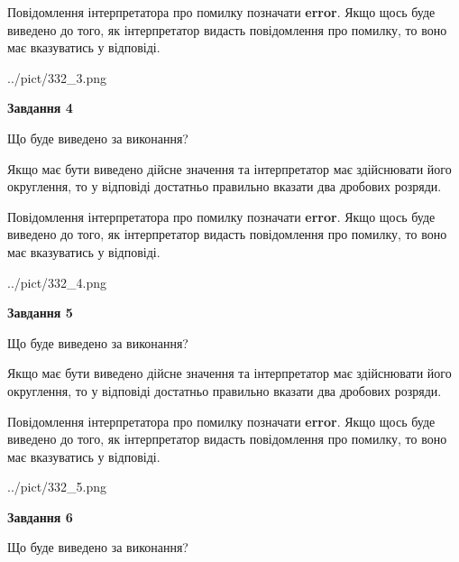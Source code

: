 \documentclass[12pt, ukrainian]{article}
\begin{document}
{\begin {Large}
Повідомлення інтерпретатора про помилку позначати \textbf{error}.
Якщо щось буде виведено до того, як інтерпретатор видасть повідомлення про помилку, 
то воно має вказуватись у відповіді. \par

\begin{center}
	{../pict/332_3.png}
\end{center}
\newpage

{\begin {center}\textbf{Завдання 4}\end {center}}\par
Що буде виведено за виконання? \par

Якщо має бути виведено дійсне значення та інтерпретатор має здійснювати його округлення, 
то у відповіді достатньо правильно вказати два дробових розряди.

Повідомлення інтерпретатора про помилку позначати \textbf{error}.
Якщо щось буде виведено до того, як інтерпретатор видасть повідомлення про помилку, 
то воно має вказуватись у відповіді. \par

\begin{center}
	{../pict/332_4.png}
\end{center}
\newpage

{\begin {center}\textbf{Завдання 5}\end {center}}\par
Що буде виведено за виконання? \par

Якщо має бути виведено дійсне значення та інтерпретатор має здійснювати його округлення, 
то у відповіді достатньо правильно вказати два дробових розряди.

Повідомлення інтерпретатора про помилку позначати \textbf{error}.
Якщо щось буде виведено до того, як інтерпретатор видасть повідомлення про помилку, 
то воно має вказуватись у відповіді. \par

\begin{center}
	{../pict/332_5.png}
\end{center}
\newpage

{\begin {center}\textbf{Завдання 6}\end {center}}\par
Що буде виведено за виконання? \par


\end{Large}}
\end{document}
